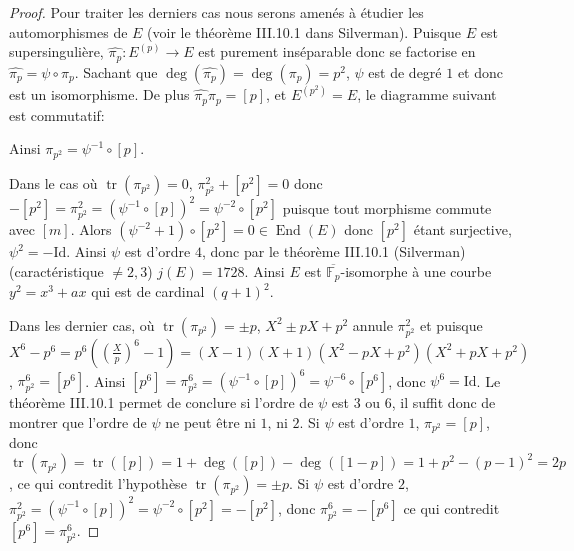 \documentclass{article}
\theoremstyle{plain}%
\theoremstyle{definition}%
\newcommand{\F}{\mathbb{F}}
\DeclareMathOperator{\End}{End}
\DeclareMathOperator{\tr}{tr}
\begin{document}
\begin{proof}
\vspace{1em}
Pour traiter les derniers cas nous serons amenés à étudier les automorphismes de $E$ (voir le théorème III.10.1 dans Silverman). Puisque $E$ est supersingulière, $\widehat{\pi_p} : E^{(p)} \to E$ est purement inséparable donc se factorise en  $\widehat{\pi_p} = \psi \circ \pi_p$. Sachant que $\deg(\widehat{\pi_p}) = \deg(\pi_p) = p^2$, $\psi$ est de degré $1$ et donc est un isomorphisme. De plus $\widehat{\pi_p}\pi_p = [p]$, et $E^{(p^2)} = E$, le diagramme suivant est commutatif: 

\begin{center}
\end{center}
Ainsi $\pi_{p^2} = \psi^{-1} \circ [p]$.

\vspace{1em}
Dans le cas où $\tr(\pi_{p^2}) = 0$, $\pi_{p^2}^2 + [p^2] = 0$ donc $-[p^2] = \pi_{p^2}^2 = (\psi^{-1} \circ [p])^2 = \psi^{-2} \circ [p^2]$ puisque tout morphisme commute avec $[m]$. Alors $(\psi^{-2} +1)\circ [p^2] = 0\in \End(E)$ donc $[p^2]$ étant surjective, $\psi^2 = -\text{Id}$.
Ainsi $\psi$ est d'ordre $4$, donc par le théorème III.10.1 (Silverman) (caractéristique $\neq 2, 3$) $j(E) = 1728$.
Ainsi $E$ est $\overline{\F_p}$-isomorphe à une courbe $y^2=x^3 + ax$ qui est de cardinal $(q+1)^2$.

\vspace{1em}
Dans les dernier cas, où $\tr(\pi_{p^2}) = \pm p$, $X^2 \pm p X +p^2$ annule $\pi_{p^2}^2$ et puisque $X^6 - p^6 = p^6 ((\frac{X}{p})^6 - 1) = (X-1)(X+1)(X^2 -pX + p^2)(X^2 + pX + p^2)$, $\pi_{p^2}^6 = [p^6]$. Ainsi $[p^6] = \pi_{p^2}^6  = (\psi^{-1} \circ [p])^6 = \psi^{-6} \circ [p^6]$, donc $\psi^6 = \text{Id}$. Le théorème III.10.1 permet de conclure si l'ordre de $\psi$ est $3$ ou $6$, il suffit donc de montrer que l'ordre de $\psi$ ne peut être ni $1$, ni $2$.
Si $\psi$ est d'ordre $1$, $\pi_{p^2} = [p]$, donc $\tr(\pi_{p^2}) = \tr([p]) = 1 + \deg([p]) - \deg([1-p]) = 1 + p^2 -(p-1)^2 = 2p$, ce qui contredit l'hypothèse $\tr(\pi_{p^2}) = \pm p$. 
Si $\psi$ est d'ordre $2$, $\pi_{p^2}^2 = (\psi^{-1} \circ [p])^2 = \psi^{-2} \circ [p^2] = - [p^2]$, donc $\pi_{p^2}^6 = -[p^6]$ ce qui contredit $[p^6] = \pi_{p^2}^6$. 
\end{proof}
\end{document}
